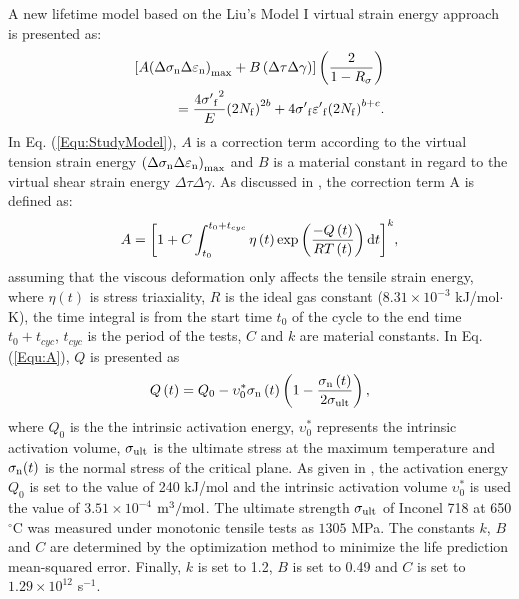 \documentclass[preprint,5p,twocolumn,11pt,sort&compress]{elsarticle}
\begin{document}
A new lifetime model based on the Liu's Model I virtual strain energy approach is presented as:
\begin{equation}
\begin{aligned}
\left[ {A{{\left( {\Delta {\sigma _{\rm n}}\Delta {\varepsilon _{\rm n}}} \right)}_{\max }} + B\left( {\Delta \tau \Delta \gamma } \right)} \right]\left( {\frac{2}{{1 - {R_\sigma }}}} \right)\\
= \frac{{4{{\sigma '}_{\rm f}}^2}}{E}{\left( {2{N_{\rm f}}} \right)^{2b}} + 4{{\sigma '}_{\rm f}}{{\varepsilon '}_{\rm f}}{\left( {2{N_{\rm f}}} \right)^{b + c}}.
\end{aligned}
\label{Equ:StudyModel}
\end{equation}
In Eq. (\ref{Equ:StudyModel}), $A$ is a correction term according to the virtual tension strain energy ${{\left( {\Delta {\sigma _{\rm n}}\Delta {\varepsilon _{\rm n}}} \right)}_{\max }}$ and $B$ is a material constant in regard to the virtual shear strain energy ${\Delta \tau \Delta \gamma }$.
As discussed in \cite{Vose2013}, the correction term A is defined as:
\begin{equation}
A = {\left[ {1 + C\int_{{t_0}}^{{t_0} + {t_{cyc}}} {\eta \left( t \right)\exp \left( {\frac{{ - Q\left( t \right)}}{{RT\left( t \right)}}} \right){\rm{d}}t} } \right]^k},
\label{Equ:A}
\end{equation}
assuming that the viscous deformation only affects the tensile strain energy, where $\eta \left( t \right)$ is stress triaxiality, $R$ is the ideal gas constant ($8.31\times10^{-3}$ kJ/mol$\cdot$K), the time integral is from the start time $t_0$ of the cycle to the end time $t_0 + t_{cyc}$, $t_{cyc}$ is the period of the tests, $C$ and $k$ are material constants.
In Eq. (\ref{Equ:A}), $Q$ is presented \cite{Warren2006,Warren2008} as
\begin{equation}
Q\left( t \right) = {Q_0} - \upsilon _0^*{\sigma _{\rm n}}\left( t \right)\left( {1 - \frac{{{\sigma _{\rm n}}\left( t \right)}}{{2{\sigma _{\rm ult}}}}} \right),
\label{Equ:creep_activation_energy}
\end{equation}
where $Q_0$ is the the intrinsic activation energy, $\upsilon _0^*$ represents the intrinsic activation volume, $\sigma_{\rm ult}$ is the ultimate stress at the maximum temperature and $\sigma_{\rm n}(t)$ is the normal stress of the critical plane.
As given in \cite{Warren2008}, the activation energy $Q_0$ is set to the value of 240 kJ/mol and the intrinsic activation volume $\upsilon _0^*$ is used the value of $3.51\times10^{-4}$ $\rm{m}^{3}/\rm{mol}$. The ultimate strength $\sigma_{\rm ult}$ of Inconel 718 at 650$^\circ$C was measured under monotonic tensile tests as $1305$ MPa. The constants $k$, $B$ and $C$ are determined by the optimization method to minimize the life prediction mean-squared error. Finally, $k$ is set to 1.2, $B$ is set to 0.49 and $C$ is set to $1.29\times10^{12}$ s$^{-1}$.
\end{document}
